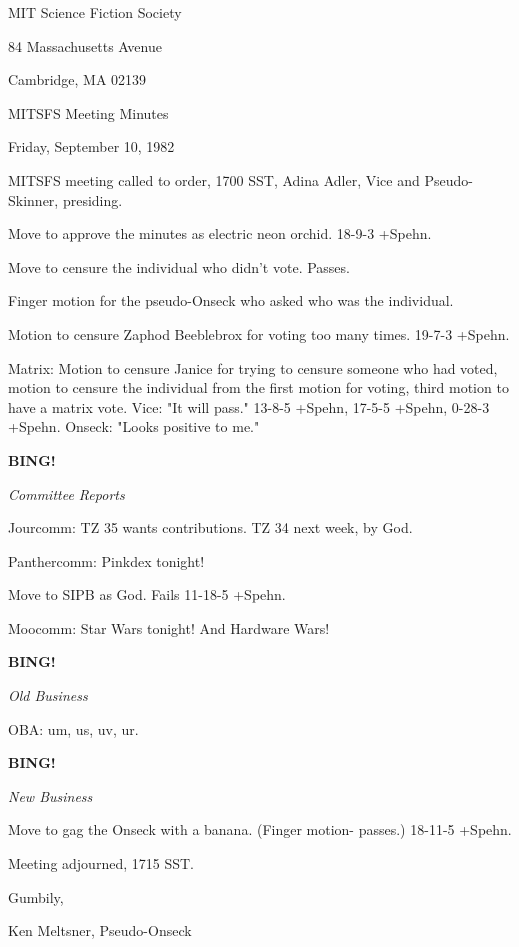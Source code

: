 \documentclass[12pt]{article}
\newcommand{\bing}{{\bf BING!} }
\newcommand{\goto}[1]{\bing \vskip 12pt \centerline{{\em{#1}}}}
\begin{document}
\begin{center}

MIT Science Fiction Society 

84 Massachusetts Avenue

Cambridge, MA 02139

\vspace{12pt}

MITSFS Meeting Minutes 

Friday, September 10, 1982

\end{center}
 
\vspace{18pt}

\setlength{\parskip}{6pt}

\noindent
MITSFS meeting called to order, 1700 SST,
Adina Adler, Vice and Pseudo-Skinner, presiding.

Move to approve the minutes as electric neon orchid. 18-9-3 +Spehn.

Move to censure the individual who didn't vote. Passes.

Finger motion for the pseudo-Onseck who asked who was the individual.

Motion to censure Zaphod Beeblebrox for voting too many times. 19-7-3 +Spehn.

Matrix: Motion to censure Janice for trying to censure someone who had voted, motion to censure the individual from the first motion for voting, third motion to have a matrix vote. Vice: "It will pass." 13-8-5 +Spehn, 17-5-5 +Spehn, 0-28-3 +Spehn. Onseck: "Looks positive to me."

\goto{Committee Reports}

Jourcomm: TZ 35 wants contributions. TZ 34 next week, by God.

Panthercomm: Pinkdex tonight!

Move to SIPB as God. Fails 11-18-5 +Spehn.

Moocomm: Star Wars tonight! And Hardware Wars!

\goto{Old Business}

OBA: um, us, uv, ur.

\goto{New Business}

Move to gag the Onseck with a banana. (Finger motion- passes.) 18-11-5 +Spehn.

\vspace{12pt}

\noindent
Meeting adjourned, 1715 SST.

\vspace{18pt}

\centerline{Gumbily,}
\centerline{Ken Meltsner, Pseudo-Onseck}
\end{document}
